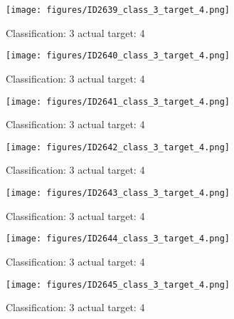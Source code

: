 \begin{figure}[h!]
\begin{center}
\texttt{[image: figures/ID2639\_class\_3\_target\_4.png]}
\end{center}
\caption{ Classification: 3 actual target: 4}
\label{fig:ID2639_class_3_target_4}
\end{figure}
\begin{figure}[h!]
\begin{center}
\texttt{[image: figures/ID2640\_class\_3\_target\_4.png]}
\end{center}
\caption{ Classification: 3 actual target: 4}
\label{fig:ID2640_class_3_target_4}
\end{figure}
\begin{figure}[h!]
\begin{center}
\texttt{[image: figures/ID2641\_class\_3\_target\_4.png]}
\end{center}
\caption{ Classification: 3 actual target: 4}
\label{fig:ID2641_class_3_target_4}
\end{figure}
\begin{figure}[h!]
\begin{center}
\texttt{[image: figures/ID2642\_class\_3\_target\_4.png]}
\end{center}
\caption{ Classification: 3 actual target: 4}
\label{fig:ID2642_class_3_target_4}
\end{figure}
\begin{figure}[h!]
\begin{center}
\texttt{[image: figures/ID2643\_class\_3\_target\_4.png]}
\end{center}
\caption{ Classification: 3 actual target: 4}
\label{fig:ID2643_class_3_target_4}
\end{figure}
\begin{figure}[h!]
\begin{center}
\texttt{[image: figures/ID2644\_class\_3\_target\_4.png]}
\end{center}
\caption{ Classification: 3 actual target: 4}
\label{fig:ID2644_class_3_target_4}
\end{figure}
\begin{figure}[h!]
\begin{center}
\texttt{[image: figures/ID2645\_class\_3\_target\_4.png]}
\end{center}
\caption{ Classification: 3 actual target: 4}
\label{fig:ID2645_class_3_target_4}
\end{figure}
